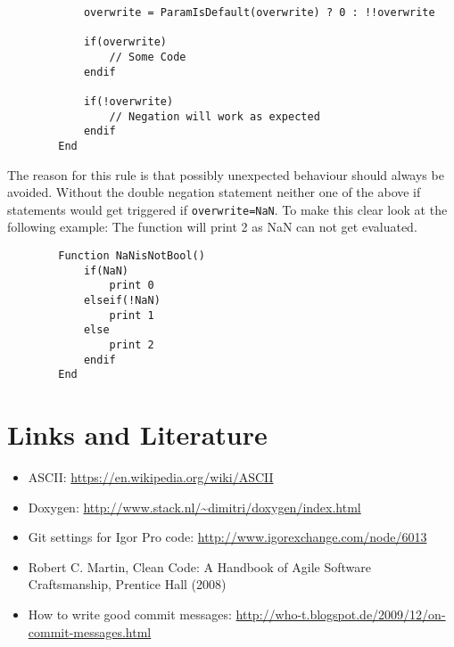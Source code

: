\documentclass{scrartcl}
\begin{document}
\begin{itemize}
\begin{verbatim}
			overwrite = ParamIsDefault(overwrite) ? 0 : !!overwrite

			if(overwrite)
				// Some Code
			endif

			if(!overwrite)
				// Negation will work as expected
			endif
		End
	\end{verbatim}
	The reason for this rule is that possibly unexpected behaviour should always be avoided.
	Without the double negation statement neither one of the above if statements would get triggered if \texttt{overwrite=NaN}.\newline
	To make this clear look at the following example:
	The function will print 2 as NaN can not get evaluated.
	\begin{verbatim}
		Function NaNisNotBool()
			if(NaN)
				print 0
			elseif(!NaN)
				print 1
			else
				print 2
			endif
		End
	\end{verbatim}
\end{itemize}
%
\section{Links and Literature}
%
\begin{itemize}
	\item ASCII: \url{https://en.wikipedia.org/wiki/ASCII}
%
	\item Doxygen: \url{http://www.stack.nl/~dimitri/doxygen/index.html}
%
	\item Git settings for Igor Pro code: \url{http://www.igorexchange.com/node/6013}
%
	\item Robert C. Martin, Clean Code: A Handbook of Agile Software Craftsmanship, Prentice Hall (2008)
%
	\item How to write good commit messages: \url{http://who-t.blogspot.de/2009/12/on-commit-messages.html}
\end{itemize}
%
\end{document}
